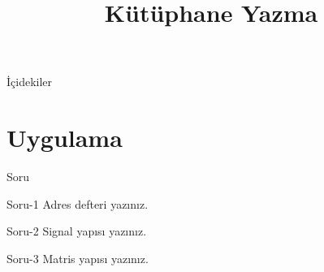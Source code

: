 
\title[Ders 7] {Kütüphane Yazma}

\frame{\titlepage}
\begin{frame}[fragile]{İçidekiler}
    \tableofcontents
\end{frame}
\section{Uygulama}
\begin{frame}[fragile]{Soru}
    \begin{alertblock}{Soru-1}
        Adres defteri yazınız.
    \end{alertblock}
    \begin{alertblock}{Soru-2}
        Signal yapısı yazınız.
    \end{alertblock}
    \begin{alertblock}{Soru-3}
        Matris yapısı yazınız.
    \end{alertblock}
\end{frame}

